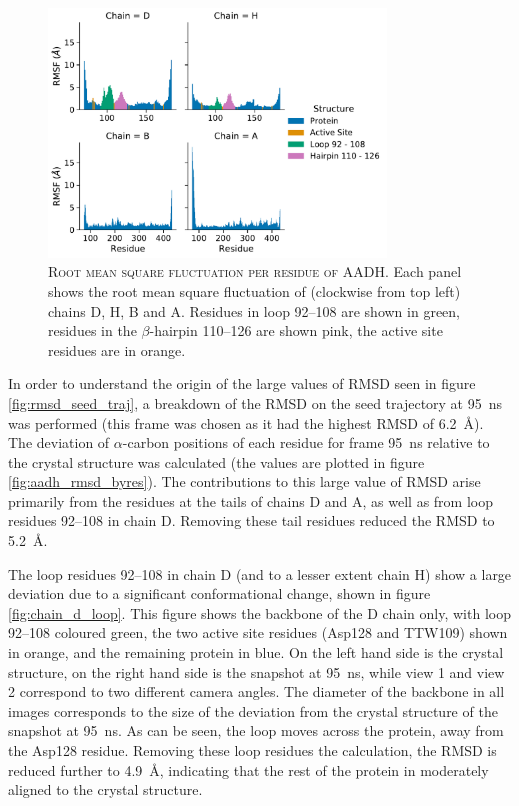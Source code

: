 \begin{figure}
 \centering
 \includegraphics[width=0.8\textwidth]{chapters/aadh/figures/RMSF_by_residue.pdf}
 \caption[Root mean square fluctuation per residue of AADH]{\textsc{Root mean square fluctuation per residue of AADH}. Each panel shows the root mean square fluctuation of (clockwise from top left) chains D, H, B and A. Residues in loop \numrange[range-phrase=\text{--}]{92}{108} are shown in green, residues in the $\beta$-hairpin \numrange[range-phrase=\text{--}]{110}{126} are shown pink, the active site residues are in orange.}
 \label{fig:rmsf_per_residue}
\end{figure}


In order to understand the origin of the large values of RMSD seen in figure \ref{fig:rmsd_seed_traj}, a breakdown of the RMSD on the seed trajectory at \SI{95}{\nano\second} was performed (this frame was chosen as it had the highest RMSD of \SI{6.2}{\angstrom}). The deviation of  $\alpha$-carbon positions of each residue for  frame \SI{95}{\nano\second} relative to the crystal structure was calculated (the values are plotted in figure \ref{fig:aadh_rmsd_byres}).  The contributions to this large value of RMSD arise primarily from the residues at the tails of chains D and A, as well as from loop residues \numrange[range-phrase=\text{--}]{92}{108} in chain D. Removing these tail residues reduced the RMSD to \SI{5.2}{\angstrom}. 

The loop residues \numrange[range-phrase=\text{--}]{92}{108} in chain D (and to a lesser extent chain H) show a large deviation due to a significant conformational change, shown in figure \ref{fig:chain_d_loop}. This figure shows the backbone of the D chain only, with loop \numrange[range-phrase=\text{--}]{92}{108} coloured green, the two active site residues (Asp128 and TTW109) shown in orange, and the remaining protein in blue. On the left hand side is the crystal structure, on the right hand side is the snapshot at \SI{95}{\nano\second}, while view 1 and view 2 correspond to two different camera angles. The diameter of the backbone in all images corresponds to the  size of the deviation from the crystal structure of the snapshot at \SI{95}{\nano\second}. As can be seen, the loop moves across the protein, away from the Asp128 residue. Removing these loop residues the calculation, the RMSD is reduced further to \SI{4.9}{\angstrom}, indicating that the rest of the protein in moderately aligned to the crystal structure. 

